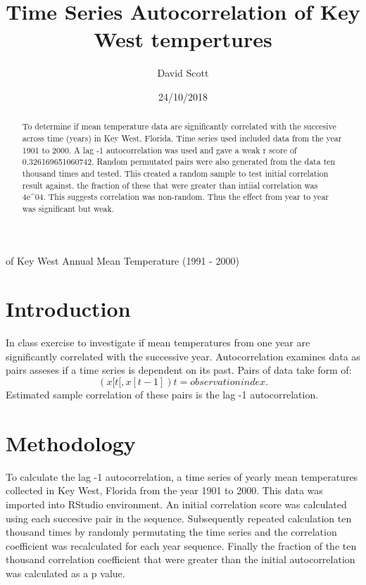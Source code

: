 \documentclass[12pt]{article}
\title{Time Series Autocorrelation of Key West tempertures}
\author{David Scott}
\date{24/10/2018}
\begin{document}
    \Autocorrelation of Key West Annual Mean Temperature (1991 - 2000)

    \begin{abstract}
        To determine if mean temperature data are significantly correlated with the succesive across time (years) in Key West, Florida. 
        Time series used included data from the year 1901 to 2000. A lag -1 autocorrelation was used and gave a weak r score of 0.326169651060742. Random permutated pairs were also 
        generated from the data ten thousand times and tested. This created a random sample to test initial correlation result against. the fraction of these 
        that were greater than intiial correlation was 4e^04. This suggests correlation was non-random. Thus the effect from year to year was significant but weak.  

    \end{abstract} 

    \section{Introduction}
        In class exercise to investigate if mean temperatures from one year are
        significantly correlated with the successive year. 
        Autocorrelation examines data as pairs asseses if a time series is 
        dependent on its past. Pairs of data take form of:
        \begin{equation}
        (x[t[,x[t-1]) 
        t = observation index. 
        \end{equation}
        Estimated sample correlation of these pairs is the lag -1 autocorrelation. 

    \section{Methodology}
        To calculate the lag -1 autocorrelation, a time series of yearly mean temperatures collected in Key West, 
        Florida from the year 1901 to 2000. This data was imported into RStudio environment. 
        An initial correlation score was calculated using each succesive pair in the sequence. 
        Subsequently repeated calculation ten thousand times by randomly permutating the time series and
        the correlation coefficient was recalculated for each year sequence. Finally the 
        fraction of the ten thousand correlation coefficient that were greater than the 
        initial autocorrelation was calculated as a p value. 
\end{document}
